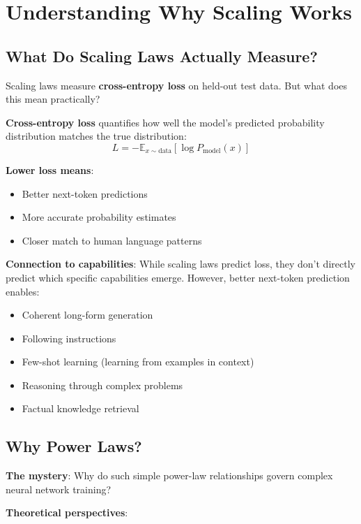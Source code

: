 \documentclass{article}
\begin{document}
\section{Understanding Why Scaling Works}

\subsection{What Do Scaling Laws Actually Measure?}

Scaling laws measure \textbf{cross-entropy loss} on held-out test data. But what does this mean practically?

\textbf{Cross-entropy loss} quantifies how well the model's predicted probability distribution matches the true distribution:
\[
L = -\mathbb{E}_{x \sim \text{data}}[\log P_{\text{model}}(x)]
\]

\textbf{Lower loss means}:
\begin{itemize}
\item Better next-token predictions
\item More accurate probability estimates
\item Closer match to human language patterns
\end{itemize}

\textbf{Connection to capabilities}: While scaling laws predict loss, they don't directly predict which specific capabilities emerge. However, better next-token prediction enables:
\begin{itemize}
\item Coherent long-form generation
\item Following instructions
\item Few-shot learning (learning from examples in context)
\item Reasoning through complex problems
\item Factual knowledge retrieval
\end{itemize}

\subsection{Why Power Laws?}

\textbf{The mystery}: Why do such simple power-law relationships govern complex neural network training?

\textbf{Theoretical perspectives}:
\end{document}
